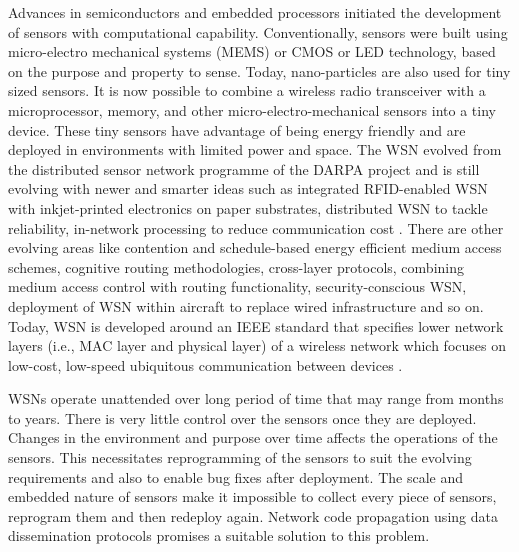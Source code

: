 \documentclass[conference,man]{IEEEtran}
\begin{document}
Advances in semiconductors and embedded processors initiated the development of sensors with computational capability. 
Conventionally, sensors were built using micro-electro mechanical systems (MEMS) or CMOS or LED technology, based on the purpose and property to sense. 
Today, nano-particles are also used for tiny sized sensors.
It is now possible to combine a wireless radio transceiver with a microprocessor, memory, and other micro-electro-mechanical sensors into a tiny device.
These tiny sensors have advantage of being energy friendly and are deployed in environments with limited power and space.
The WSN evolved from the distributed sensor network programme of the DARPA project and is still evolving with newer and smarter ideas such as integrated RFID-enabled WSN with inkjet-printed electronics on paper substrates,  distributed WSN to tackle reliability, in-network processing to reduce communication cost \cite{5498900}. 
There are other evolving areas like contention and schedule-based energy efficient medium access schemes, cognitive routing methodologies, cross-layer protocols, combining medium access control with routing functionality, security-conscious WSN,  deployment of WSN within aircraft to replace  wired infrastructure and so on.
Today, WSN is developed around an IEEE standard that specifies lower network layers (i.e., MAC layer and physical layer) of a wireless network which focuses on low-cost, low-speed ubiquitous communication between devices \cite{893287}.

WSNs operate unattended over long period of time that may range from months to years.
There is very little control over the sensors once they are deployed.
Changes in the environment and purpose over time affects the operations of the sensors. 
This necessitates reprogramming of the sensors to suit the evolving requirements and also to enable bug fixes after deployment.
The scale and embedded nature of sensors make it impossible to collect every piece of sensors, reprogram them and then redeploy again. 
Network code propagation using data dissemination protocols promises a suitable solution to this problem.
\end{document}
